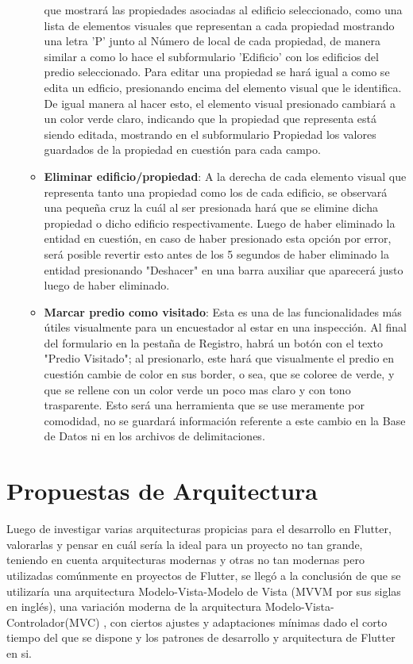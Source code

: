 \begin{itemize}
\begin{itemize}
                    que mostrará las propiedades asociadas al edificio seleccionado, como una lista de elementos visuales que representan a cada propiedad mostrando una letra 'P' junto
                    al Número de local de cada propiedad, de manera similar a como lo hace el subformulario 'Edificio' con los edificios del predio seleccionado.
                    Para editar una propiedad se hará igual a como se edita un edficio, presionando encima del elemento visual que le identifica. De igual manera al hacer esto, el elemento visual
                    presionado cambiará a un color verde claro, indicando que la propiedad que representa está siendo editada, mostrando en el subformulario Propiedad los valores guardados
                    de la propiedad en cuestión para cada campo.
              \item \textbf{Eliminar edificio/propiedad}: A la derecha de cada elemento visual que representa tanto una propiedad como los de cada edificio, se observará una pequeña cruz
                    la cuál al ser presionada hará que se elimine dicha propiedad o dicho edificio respectivamente. Luego de haber eliminado la entidad en cuestión, en caso de haber presionado
                    esta opción por error, será posible revertir esto antes de los 5 segundos de haber eliminado la entidad presionando "Deshacer" en una barra auxiliar que aparecerá justo luego de
                    haber eliminado.
              \item \textbf{Marcar predio como visitado}: Esta es una de las funcionalidades más útiles visualmente para un encuestador al estar en una inspección. Al final del formulario en la pestaña
                    de Registro, habrá un botón con el texto "Predio Visitado"; al presionarlo, este hará que visualmente el predio en cuestión cambie de color en sus border, o sea, que se coloree
                    de verde, y que se rellene con un color verde un poco mas claro y con tono trasparente. Esto será una herramienta que se use meramente por comodidad, no se guardará información
                    referente a este cambio en la Base de Datos ni en los archivos de delimitaciones.
          \end{itemize}

\end{itemize}
\section{Propuestas de Arquitectura}
Luego de investigar varias arquitecturas propicias para el desarrollo en Flutter, valorarlas y pensar en cuál sería la ideal para un proyecto no tan grande,
teniendo en cuenta arquitecturas modernas y otras no tan modernas pero utilizadas comúnmente en proyectos de Flutter, se llegó a la conclusión de que se utilizaría
una arquitectura Modelo-Vista-Modelo de Vista (MVVM por sus siglas en inglés)\cite{MVVM}, una variación moderna de la arquitectura Modelo-Vista-Controlador(MVC) \cite{MVC},
con ciertos ajustes y adaptaciones mínimas dado el corto tiempo del que se dispone y los patrones de desarrollo y arquitectura de Flutter en si.
